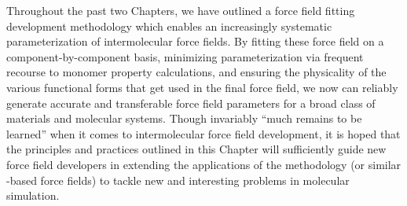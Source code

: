 Throughout the past two Chapters, we have outlined a force field fitting
development methodology which enables an increasingly systematic
parameterization of intermolecular force fields.  By fitting these force field
on a component-by-component basis, minimizing parameterization via frequent
recourse to monomer property calculations, and ensuring the physicality of the
various functional forms that get used in the final force field, we now can
reliably generate accurate and transferable force field parameters for a broad
class of materials and molecular systems. Though invariably ``much remains to
be learned'' when it comes to intermolecular force field development, it is
hoped that the principles and practices outlined in this Chapter will
sufficiently guide new force field developers in extending the applications of
the \mastiff methodology (or similar \eda-based force fields) to tackle new
and interesting problems in molecular simulation.
